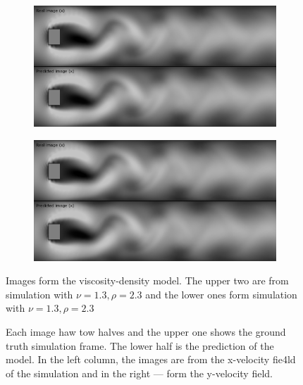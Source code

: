 \documentclass{llncs}
\begin{document}
\begin{figure}
  \begin{subfigure}{.5\textwidth}
    \centering
    \includegraphics[width=1\linewidth]{imgs/single_fluid_x_2}
  \end{subfigure}
  \begin{subfigure}{.5\textwidth}
    \centering
    \includegraphics[width=1\linewidth]{imgs/single_fluid_y_2}
  \end{subfigure}

  \begin{center}
  Images form the viscosity-density model. The upper two are from simulation with $\nu=1.3, \rho=2.3$ and the lower ones form simulation with $\nu=1.3, \rho=2.3$
  \end{center}

  \caption{Each image haw tow halves and the upper one shows the ground truth simulation frame. The lower half is the prediction of the model. In the left column, the images are from the x-velocity fie4ld of the simulation and in the right --- form the y-velocity field.}\label{fig:single_images}
\end{figure}
\end{document}
